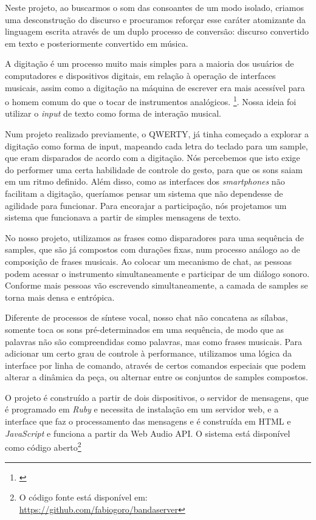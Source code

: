 Neste projeto, ao buscarmos o som das consoantes de um modo isolado, criamos uma desconstrução do discurso e procuramos reforçar esse caráter atomizante da linguagem escrita através de um duplo processo de conversão: discurso convertido em texto e posteriormente convertido em música.

A digitação é um processo muito mais simples para a maioria dos usuários de computadores e dispositivos digitais, em relação à operação de interfaces musicais, assim como a digitação na máquina de escrever era mais acessível para o homem comum do que o tocar de instrumentos analógicos. \footnote{\cite[172]{Levinson2001}}. Nossa ideia foi utilizar o \emph{input} de texto como forma de interação musical. 

Num projeto realizado previamente, o QWERTY, já tinha começado a explorar a digitação como forma de input, mapeando cada letra do teclado para um sample, que eram disparados de acordo com a digitação. Nós percebemos que isto exige do performer uma certa habilidade de controle do gesto, para que os sons saiam em um ritmo definido. Além disso, como as interfaces dos \emph{smartphones} não facilitam a digitação, queríamos pensar um sistema que não dependesse de agilidade para funcionar. Para encorajar a participação, nós projetamos um sistema que funcionava a partir de simples mensagens de texto.

No nosso projeto, utilizamos as frases como disparadores para uma sequência de samples, que são já compostos com durações fixas, num processo análogo ao de composição de frases musicais. Ao colocar um mecanismo de chat, as pessoas podem acessar o instrumento simultaneamente e participar de um diálogo sonoro. Conforme mais pessoas vão escrevendo simultaneamente, a camada de samples se torna mais densa e entrópica.

Diferente de processos de síntese vocal, nosso chat não concatena as sílabas, somente toca os sons pré-determinados em uma sequência, de modo que as palavras não são compreendidas como palavras, mas como frases musicais. Para adicionar um certo grau de controle à performance, utilizamos uma lógica da interface por linha de comando, através de certos comandos especiais que podem alterar a dinâmica da peça, ou alternar entre os conjuntos de samples compostos.

O projeto é construído a partir de dois dispositivos, o servidor de mensagens, que é programado em \emph{Ruby} e necessita de instalação em um servidor web, e a interface que faz o processamento das mensagens e é construída em HTML e \emph{JavaScript} e funciona a partir da Web Audio API. O sistema está disponível como código aberto\footnote{O código fonte está disponível em: \url{https://github.com/fabiogoro/bandaserver}}   

